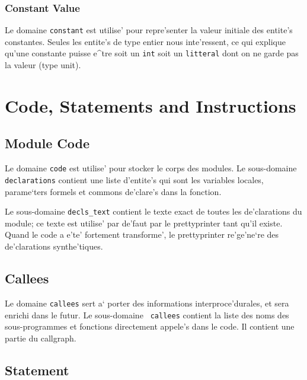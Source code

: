 \subsubsection{Constant Value}
\label{subsubsection-constant}

{
Le domaine \verb/constant/ est utilise' pour repre'senter la valeur
initiale des entite's constantes. Seules les entite's de type entier
nous inte'ressent, ce qui explique qu'une constante puisse e^tre soit un
\verb/int/ soit un \verb/litteral/ dont on ne garde pas la valeur (type unit).
}

\section{Code, Statements and Instructions}
\label{code}

\subsection{Module Code}
\label{subsection-code}

{ 
Le domaine \verb/code/ est utilise'
pour stocker le corps des modules. Le sous-domaine \verb/declarations/
contient une liste d'entite's qui sont les variables locales,
parame`ters formels et commons de'clare's dans la fonction.

Le sous-domaine {\tt decls\_text} contient le texte exact de toutes les
de'clarations du module; ce texte est utilise' par de'faut par le
prettyprinter tant qu'il existe. Quand le code a e'te' fortement
transforme', le prettyprinter re'ge'ne`re des de'clarations
synthe'tiques.
}

\subsection{Callees}
\label{subsection-callees}


{ Le domaine {\tt callees} sert a` porter des informations
interproce'durales, et sera enrichi dans le futur.  Le sous-domaine {\tt
callees} contient la liste des noms des sous-programmes et fonctions
directement appele's dans le code. Il contient une partie du callgraph.
}

\subsection{Statement}
\label{subsection-statement}

